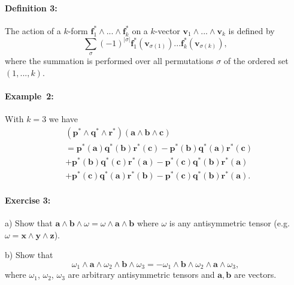 \paragraph{Definition 3:}

The action of a $k$-form $\mathbf{f}_{1}^{*}\wedge...\wedge\mathbf{f}_{k}^{*}$
on a $k$-vector $\mathbf{v}_{1}\wedge...\wedge\mathbf{v}_{k}$ is
defined by\[
\sum_{\sigma}(-1)^{\left|\sigma\right|}\mathbf{f}_{1}^{*}(\mathbf{v}_{\sigma(1)})...\mathbf{f}_{k}^{*}(\mathbf{v}_{\sigma(k)}),\]
where the summation is performed over all permutations $\sigma$ of
the ordered set $\left(1,...,k\right)$.


\paragraph{Example~2:}

With $k=3$ we have\begin{align*}
 & (\mathbf{p}^{*}\wedge\mathbf{q}^{*}\wedge\mathbf{r}^{*})(\mathbf{a}\wedge\mathbf{b}\wedge\mathbf{c})\\
 & =\mathbf{p}^{*}(\mathbf{a})\mathbf{q}^{*}(\mathbf{b})\mathbf{r}^{*}(\mathbf{c})-\mathbf{p}^{*}(\mathbf{b})\mathbf{q}^{*}(\mathbf{a})\mathbf{r}^{*}(\mathbf{c})\\
 & +\mathbf{p}^{*}(\mathbf{b})\mathbf{q}^{*}(\mathbf{c})\mathbf{r}^{*}(\mathbf{a})-\mathbf{p}^{*}(\mathbf{c})\mathbf{q}^{*}(\mathbf{b})\mathbf{r}^{*}(\mathbf{a})\\
 & +\mathbf{p}^{*}(\mathbf{c})\mathbf{q}^{*}(\mathbf{a})\mathbf{r}^{*}(\mathbf{b})-\mathbf{p}^{*}(\mathbf{c})\mathbf{q}^{*}(\mathbf{b})\mathbf{r}^{*}(\mathbf{a}).\end{align*}



\paragraph{Exercise 3:}

a) Show that $\mathbf{a}\wedge\mathbf{b}\wedge\omega=\omega\wedge\mathbf{a}\wedge\mathbf{b}$
where $\omega$ is any antisymmetric tensor (e.g.~$\omega=\mathbf{x}\wedge\mathbf{y}\wedge\mathbf{z}$).

b) Show that\[
\omega_{1}\wedge\mathbf{a}\wedge\omega_{2}\wedge\mathbf{b}\wedge\omega_{3}=-\omega_{1}\wedge\mathbf{b}\wedge\omega_{2}\wedge\mathbf{a}\wedge\omega_{3},\]
where $\omega_{1}$, $\omega_{2}$, $\omega_{3}$ are arbitrary antisymmetric
tensors and $\mathbf{a},\mathbf{b}$ are vectors. 

